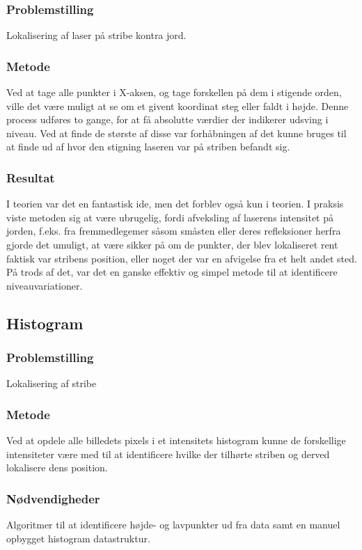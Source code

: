 \subsubsection{Problemstilling}
Lokalisering af laser på stribe kontra jord.

\subsubsection{Metode}
Ved at tage alle punkter i X-aksen, og tage forskellen på dem i stigende orden, ville det være muligt at se om et givent koordinat steg eller faldt i højde.
Denne process udføres to gange, for at få absolutte værdier der indikerer udsving i niveau. Ved at finde de største af disse var forhåbningen af det kunne bruges til at finde ud af hvor den stigning laseren var på striben befandt sig.

\subsubsection{Resultat}
I teorien var det en fantastisk ide, men det forblev også kun i teorien. I praksis viste metoden sig at være ubrugelig, fordi afveksling af laserens intensitet på jorden, f.eks. fra fremmedlegemer såsom småsten eller deres refleksioner herfra gjorde det umuligt, at være sikker på om de punkter, der blev lokaliseret rent faktisk var stribens position, eller noget der var en afvigelse fra et helt andet sted.
På trods af det, var det en ganske effektiv og simpel metode til at identificere niveauvariationer.

\subsection{Histogram}

\subsubsection{Problemstilling}
Lokalisering af stribe

\subsubsection{Metode}
Ved at opdele alle billedets pixels i et intensitets histogram kunne de forskellige intensiteter være med til at identificere hvilke der tilhørte striben og derved lokalisere dens position.

\subsubsection{Nødvendigheder}
Algoritmer til at identificere højde- og lavpunkter ud fra data samt en manuel opbygget histogram datastruktur.

